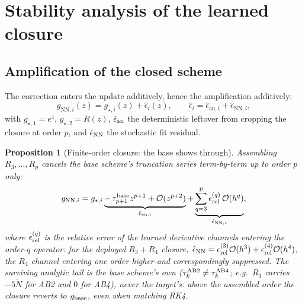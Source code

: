\documentclass[11pt]{article}
\theoremstyle{plain}
\newtheorem{proposition}{Proposition}
\theoremstyle{definition}
\newcommand{\Nddot}{\ddot{N}}
\newcommand{\bO}{\mathcal{O}}
\begin{document}
\section{Stability analysis of the learned closure}
\label{sec:nn-stability}

\subsection{Amplification of the closed scheme}
The correction enters the update additively, hence the amplification
additively:
\begin{equation}
g_{\mathrm{NN},i}(z)=g_{\star,i}(z)+\hat\epsilon_i(z),\qquad
\hat\epsilon_i=\hat\epsilon_{\mathrm{an},i}+\hat\epsilon_{\mathrm{NN},i},
\label{eq:gNN}
\end{equation}
with $g_{\star,1}=e^z$, $g_{\star,2}=R(z)$, $\hat\epsilon_{\rm an}$ the
deterministic leftover from cropping the closure at order $p$, and
$\hat\epsilon_{\rm NN}$ the stochastic fit residual.

\begin{proposition}[Finite-order closure: the base shows through]
\label{prop:base-shows}
Assembling $R_3,\dots,R_p$ cancels the base scheme's truncation series
term-by-term up to order $p$ only:
\begin{equation}
g_{\mathrm{NN},i}
=g_{\star,i}
\underbrace{-\,\tau^{\rm base}_{p+1}z^{p+1}+\bO(z^{p+2})}
_{\hat\epsilon_{\mathrm{an},i}}
+\underbrace{\sum_{q=3}^{p}\epsilon_{\rm rel}^{(q)}\,\bO(h^q)}
_{\hat\epsilon_{\mathrm{NN},i}},
\end{equation}
where $\epsilon_{\rm rel}^{(q)}$ is the relative error of the learned
derivative channels entering the order-$q$ operator: for the deployed
$R_3{+}R_4$ closure, $\hat\epsilon_{\rm NN}
=\epsilon_{\rm rel}^{(3)}\bO(h^3)+\epsilon_{\rm rel}^{(4)}\bO(h^4)$, the
$R_4$ channel entering one order higher and correspondingly suppressed.
The surviving analytic tail is the \emph{base scheme's own}
($\tau^{\rm AB2}_k\neq
\tau^{\rm AB4}_k$; e.g.\ $R_3$ carries $-5\Nddot$ for AB2 and $0$ for AB4),
never the target's: above the assembled order the closure reverts to
$g_{\rm base}$, even when matching RK4.
\end{proposition}
\end{document}
